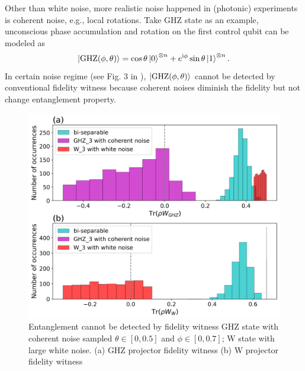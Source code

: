 \documentclass[
aps,
pra,
twocolumn,
floatfix,
]{revtex4-2}
\theoremstyle{plain}
\theoremstyle{definition}
\newcommand{\ghz}{\text{GHZ}}
\begin{document}
Other than white noise, more realistic noise happened in (photonic) experiments is coherent noise, e.g., local rotations.
Take GHZ state as an example, unconscious phase accumulation and 
rotation on the first control qubit can be modeled as 
\cite{zhouEntanglementDetectionCoherent2020}
\begin{equation}
	\ket{\ghz(\phi,\theta)}=
	\cos\theta\ket{0}^{\otimes n}+e^{\ii \phi}\sin\theta\ket{1}^{\otimes n}.
	\label{eq:coherent_noise}
\end{equation}
In certain noise regime (see Fig. 3 in \cite{zhouEntanglementDetectionCoherent2020}), $\ket{\ghz(\phi,\theta)}$ cannot be detected by conventional fidelity witness because coherent noises diminish the fidelity but not change entanglement property.
\begin{figure}[!ht]
	\centering
	\includegraphics[width=.95\linewidth]{./Code/fidelity_witness_compare_2_long.png}
	\caption{Entanglement cannot be detected by fidelity witness GHZ state with coherent noise sampled $\theta\in[0,0.5]$ and $\phi\in[0,0.7]$; W state with large white noise. (a) GHZ projector fidelity witness (b) W projector fidelity witness }
\end{figure}
\end{document}
